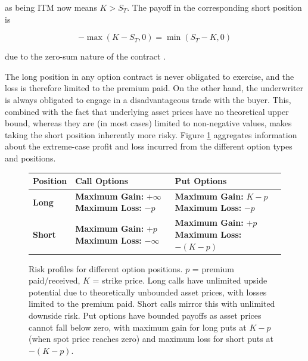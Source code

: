 \documentclass[english,12pt,a4paper,pdftex,sci,utf8]{aaltothesis}
\begin{document}
as being ITM now means $K > S_T$. The payoff in the corresponding short position is

\begin{equation}
    -\max(K-S_T,0) = \min(S_T-K,0)
\end{equation}

due to the zero-sum nature of the contract \cite[p. 10]{hull2016options}.

The long position in any option contract is never obligated to exercise, and the loss is therefore limited to the premium paid. On the other hand, the underwriter is always obligated to engage in a disadvantageous trade with the buyer. This, combined with the fact that underlying asset prices have no theoretical upper bound, whereas they are (in most cases) limited to non-negative values, makes taking the short position inherently more risky. Figure \ref{fig:optiontable} aggregates information about the extreme-case profit and loss incurred from the different option types and positions.



\begin{figure}[htbp]
\centering
\label{options-risk-table}
\begin{tabular}{|l|p{5cm}|p{5cm}|}
\hline
\textbf{Position} & \textbf{Call Options} & \textbf{Put Options} \\
\hline
\textbf{Long} & \textbf{Maximum Gain:} $+\infty$
\newline \textbf{Maximum Loss:} $-p$ & \textbf{Maximum Gain:} $K-p$
\newline \textbf{Maximum Loss:} $-p$ \\
\hline
\textbf{Short} & \textbf{Maximum Gain:} $+p$
\newline \textbf{Maximum Loss:} $-\infty$ & \textbf{Maximum Gain:} $+p$
\newline \textbf{Maximum Loss:} $-(K-p)$ \\
\hline
\end{tabular}
\caption{Risk profiles for different option positions. $p$ = premium paid/received, $K$ = strike price. Long calls have unlimited upside potential due to theoretically unbounded asset prices, with losses limited to the premium paid. Short calls mirror this with unlimited downside risk. Put options have bounded payoffs as asset prices cannot fall below zero, with maximum gain for long puts at $K-p$ (when spot price reaches zero) and maximum loss for short puts at $-(K-p)$.}\label{fig:optiontable}
\end{figure}
\end{document}
